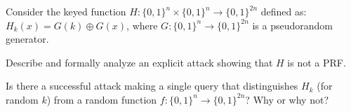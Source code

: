 \documentclass[a4paper,10pt,landscape,twocolumn]{scrartcl}
\begin{document}
\problems



\begin{exercise}
Consider the keyed function $H : \{0, 1\}^n \times \{0, 1\}^n \rightarrow \{0, 1\}^{2n}$ defined as: $H_k(x) = G(k) \oplus G(x)$, where $G: \{0, 1\}^n \rightarrow \{0, 1\}^{2n}$ is a pseudorandom generator.
\begin{subex}
Describe and formally analyze an explicit attack showing that $H$ is not a PRF.
\end{subex}
\begin{subex}
Is there a successful attack making a single query that distinguishes $H_k$ (for random $k$) from a random function $f : \{0, 1\}^n \rightarrow \{0, 1\}^{2n}$? Why or why not?
\end{subex}
\end{exercise}
\end{document}
